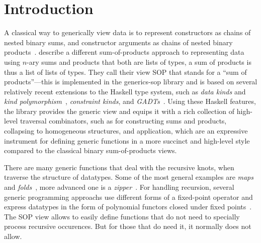 \documentclass[sigplan,review,anonymous]{acmart}\settopmatter{printfolios=true,printccs=false,printacmref=false}
\begin{document}
\maketitle


\section{Introduction}
\label{sec:introduction}

A classical way to generically view data is to represent constructors as chains of nested binary sums, and constructor arguments as chains of nested binary products~\citep{VanNoort2008, MuRec2009, Cheney2002, Magalhaes2010, Loeh2004}\nocite{Rodriguez2008}\nocite{Magalhaes2012}. \citet{VriLoeh2014} describe a different sum-of-products approach to representing data using $n$-ary sums and products that both are lists of types, a sum of products is thus a list of lists of types. They call their view SOP that stands for a ``sum of products''---this is implemented in the \textsf{generics-sop} library and is based on several relatively recent extensions to the Haskell type system, such as \emph{data kinds} and \emph{kind polymorphism}~\citep{Yorgey2012}, \emph{constraint kinds}, and \emph{GADTs}~\cite{Schrijvers2009}. Using these Haskell features, the library provides the generic view and equips it with a rich collection of high-level traversal combinators, such as for constructing sums and products, collapsing to homogeneous structures, and application, which are an expressive instrument for defining generic functions in a more succinct and high-level style compared to the classical binary sum-of-products views.

There are many generic functions that deal with the recursive knots, when traverse the structure of datatypes. Some of the most general examples are \emph{maps}~\citep{Magalhaes2010} and \emph{folds}~\citep{Meijer1991, MuRec2009}, more advanced one is a \emph{zipper}~\citep{Huet1997, MuRec2009, HiJeLo2004, Adams2010}. For handling recursion, several generic programming approachs use different forms of a fixed-point operator and express datatypes in the form of polynomial functors closed under fixed points~\citep{VanNoort2008, MuRec2009, Jansson1997, Loeh2011}\nocite{MagLoeh2012}. The SOP view allows to easily define functions that do not need to specially process recursive occurences. But for those that do need it, it normally does not allow.
\end{document}
